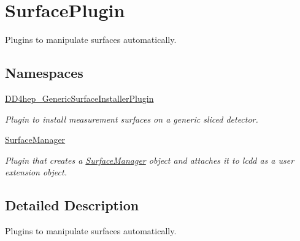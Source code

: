 \hypertarget{group___surface_plugin}{}\section{Surface\+Plugin}
\label{group___surface_plugin}


Plugins to manipulate surfaces automatically.  


\subsection*{Namespaces}
\begin{DoxyCompactItemize}
\item 
 \hyperlink{namespace_d_d4hep___generic_surface_installer_plugin}{D\+D4hep\+\_\+\+Generic\+Surface\+Installer\+Plugin}
\begin{DoxyCompactList}\small\item\em Plugin to install measurement surfaces on a generic sliced detector. \end{DoxyCompactList}\item 
 \hyperlink{namespace_surface_manager}{Surface\+Manager}
\begin{DoxyCompactList}\small\item\em Plugin that creates a \hyperlink{namespace_surface_manager}{Surface\+Manager} object and attaches it to lcdd as a user extension object. \end{DoxyCompactList}\end{DoxyCompactItemize}


\subsection{Detailed Description}
Plugins to manipulate surfaces automatically. 

